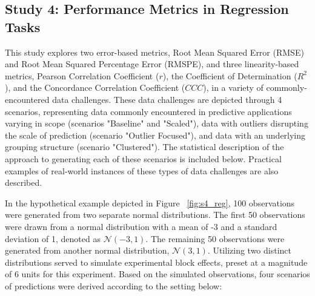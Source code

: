 \subsection{Study 4: Performance Metrics in Regression Tasks}

This study explores two error-based metrics, Root Mean Squared Error (RMSE) and Root Mean Squared Percentage Error (RMSPE), and three linearity-based metrics, 
Pearson Correlation Coefficient ($r$), the Coefficient of Determination ($R^2$), and the Concordance Correlation Coefficient ($CCC$), in a variety of commonly-encountered data challenges. These data challenges are depicted through 4 scenarios, representing data commonly encountered in predictive applications varying in scope (scenarios "Baseline" and "Scaled"), data with outliers disrupting the scale of prediction (scenario "Outlier Focused"), and data with an underlying grouping structure (scenario "Clustered"). The statistical description of the approach to generating each of these scenarios is included below. Practical examples of real-world instances of these types of data challenges are also described.

In the hypothetical example depicted in Figure ~\ref{fig:s4_reg}, 100 observations were generated from two separate normal distributions. The first 50 observations were drawn from a normal distribution with a mean of -3 and a standard deviation of 1, denoted as $\mathcal{N}(-3, 1)$. The remaining 50 observations were generated from another normal distribution, $\mathcal{N}(3, 1)$. Utilizing two distinct distributions served to simulate experimental block effects, preset at a magnitude of 6 units for this experiment. Based on the simulated observations, four scenarios of predictions were derived according to the setting below:

